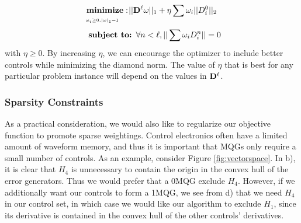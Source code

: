 \documentclass[aps,nofootinbib,pra,notitlepage,twocolumn]{revtex4-1}
\begin{document}
\newcommand{\bunderbrace}[2]{%
  \begin{array}[t]{@{}c@{}}
  #1\\
  \parbox{\widthof{#1}}{$\scriptscriptstyle#2$}
  \end{array}
}

\begin{equation}\label{eq:minimization_l2}
\begin{split}
& \ \bunderbrace{\textbf{minimize}: }{\omega_i\geq0, |\omega|_1=1} ||{\bold{D}^{\ell}}\omega||_1+ \eta\sum\omega_i||D^0_i||_2\\
&\ \ \textbf{subject to: } \forall n<\ell, ||\sum \omega_iD_i^n||=0\\
\end{split}
\end{equation}
with $\eta \geq 0$. By increasing $\eta$, we can encourage the optimizer to include better controls while minimizing the diamond norm. The value of $\eta$ that is best for any particular problem instance will depend on the values in $\bold{D}^\ell$.


\subsubsection{Sparsity Constraints}
\label{sec:sparsity}
As a practical consideration, we would also like to regularize our objective function to promote sparse weightings. Control electronics often have a limited amount of waveform memory, and thus it is important that MQGs only require a small number of controls. As an example, consider Figure \ref{fig:vectorspace}. In b), it is clear that $H_4$ is unnecessary to contain the origin in the convex hull of the error generators. Thus we would prefer that a $0$MQG exclude $H_4$. However, if we additionally want our controls to form a 1MQG, we see from d) that we need $H_4$ in our control set, in which case we would like our algorithm to exclude $H_1$, since its derivative is contained in the convex hull of the other controls' derivatives. 
\end{document}
